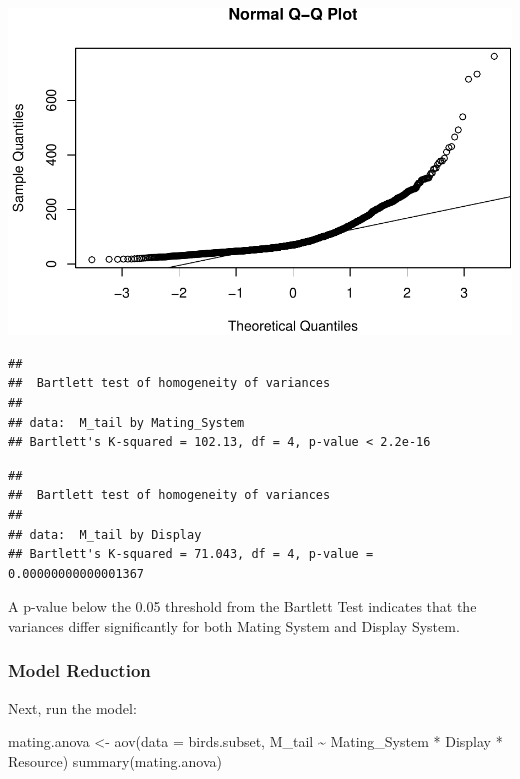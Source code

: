 \documentclass[
  12pt,
]{article}
\newenvironment{Shaded}{\begin{snugshade}}{\end{snugshade}}
\newcommand{\AttributeTok}[1]{\textcolor[rgb]{0.77,0.63,0.00}{#1}}
\newcommand{\FunctionTok}[1]{\textcolor[rgb]{0.00,0.00,0.00}{#1}}
\newcommand{\NormalTok}[1]{#1}
\newcommand{\OtherTok}[1]{\textcolor[rgb]{0.56,0.35,0.01}{#1}}
\newcommand{\SpecialCharTok}[1]{\textcolor[rgb]{0.00,0.00,0.00}{#1}}
\begin{document}
\includegraphics{Project_Code_files/figure-latex/question_2_part_1-1.pdf}

\begin{verbatim}
## 
##  Bartlett test of homogeneity of variances
## 
## data:  M_tail by Mating_System
## Bartlett's K-squared = 102.13, df = 4, p-value < 2.2e-16
\end{verbatim}

\begin{verbatim}
## 
##  Bartlett test of homogeneity of variances
## 
## data:  M_tail by Display
## Bartlett's K-squared = 71.043, df = 4, p-value = 0.00000000000001367
\end{verbatim}

A p-value below the 0.05 threshold from the Bartlett Test indicates that
the variances differ significantly for both Mating System and Display
System.

\hypertarget{model-reduction}{%
\subsubsection{Model Reduction}\label{model-reduction}}

Next, run the model:

\begin{Shaded}
\begin{Highlighting}[]
\NormalTok{mating.anova }\OtherTok{\textless{}{-}} \FunctionTok{aov}\NormalTok{(}\AttributeTok{data =}\NormalTok{ birds.subset, M\_tail }\SpecialCharTok{\textasciitilde{}}\NormalTok{ Mating\_System }\SpecialCharTok{*}\NormalTok{ Display }\SpecialCharTok{*}\NormalTok{ Resource)}
\FunctionTok{summary}\NormalTok{(mating.anova)}
\end{Highlighting}
\end{Shaded}
\end{document}
